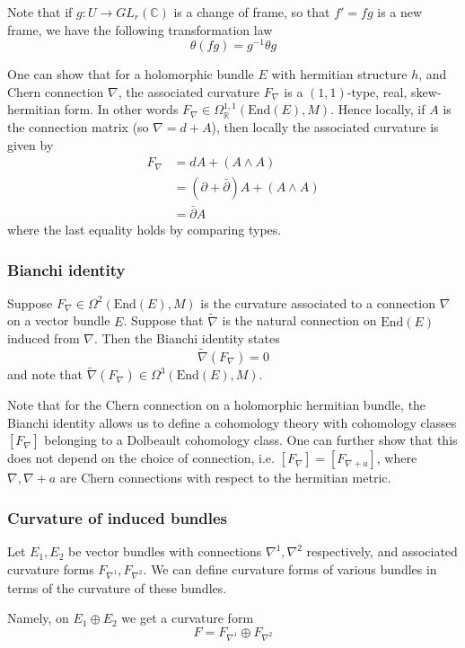 \documentclass[a4paper]{article}
\theoremstyle{definition} \newtheorem*{definition}{Definition}
\theoremstyle{definition} \newtheorem*{definitions}{Definitions}
\theoremstyle{plain} \newtheorem{theorem}{Theorem}[section]
\theoremstyle{plain} \newtheorem{proposition}[theorem]{Proposition}
\theoremstyle{plain} \newtheorem{corollary}[theorem]{Corollary}
\theoremstyle{plain} \newtheorem{lemma}[theorem]{Lemma}
\theoremstyle{plain} \newtheorem{example}[theorem]{Example}
\newcommand{\realnos}{\mathbb{R}}
\newcommand{\complexnos}{\mathbb{C}}
\newcommand{\End}{\text{End}}
\begin{document}
Note that if $g:U\to GL_r(\complexnos)$ is a change of frame, so that $f'=fg$ is a new frame, we have the following transformation law
$$\mathfrak{\theta}(fg)=g^{-1} \mathbb{\theta}g$$

One can show that for a holomorphic bundle $E$ with hermitian structure $h$, and Chern connection $\nabla$, the associated curvature $F_\nabla$ is a $(1,1)$-type, real, skew-hermitian form. In other words $F_\nabla\in \Omega^{1,1}_\realnos (\End(E), M)$. Hence locally, if $A$ is the connection matrix (so $\nabla = d+A$), then locally the associated curvature is given by
\begin{align*}
F_\nabla & = dA + (A\wedge A) \\
& = (\partial + \bar{\partial})A + (A\wedge A) \\
& = \bar{\partial} A
\end{align*}
where the last equality holds by comparing types.

\subsubsection{Bianchi identity}
Suppose $F_\nabla\in \Omega^2(\End(E), M)$ is the curvature associated to a connection $\nabla$ on a vector bundle $E$. Suppose that $\tilde{\nabla}$ is the natural connection on $\End(E)$ induced from $\nabla$. Then the Bianchi identity states   
$$\tilde{\nabla}(F_\nabla)=0$$
and note that $\tilde{\nabla}(F_\nabla)\in \Omega^3(\End(E), M)$.

Note that for the Chern connection on a holomorphic hermitian bundle, the Bianchi identity allows us to define a cohomology theory with cohomology classes $[F_\nabla]$ belonging to a Dolbeault cohomology class. One can further show that this does not depend on the choice of connection, i.e. $[F_\nabla]=[F_{\nabla+a}]$, where $\nabla, \nabla+a$ are Chern connections with respect to the hermitian metric. 

\subsubsection{Curvature of induced bundles}
Let $E_1, E_2$ be vector bundles with connections $\nabla^1, \nabla^2$ respectively, and associated curvature forms $F_{\nabla^1}, F_{\nabla^2}$. We can define curvature forms of various bundles in terms of the curvature of these bundles. 

Namely, on $E_1\oplus E_2$ we get a  curvature form
$$F = F_{\nabla^1}\oplus F_{\nabla^2}$$
\end{document}
